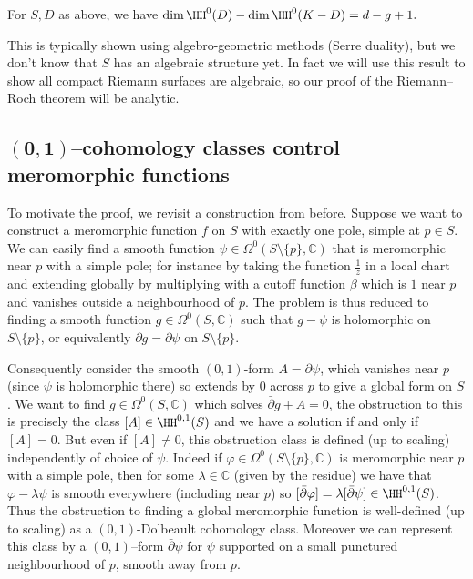 \begin{theorem}
    For \(S,D\) as above, we have
    \(\dim\HH^0(D)-\dim\HH^0(K-D)=d-g+1.\)
\end{theorem}

This is typically shown using algebro-geometric methods (Serre duality), but we
don't know that \(S\) has an algebraic structure yet. In fact we will use this
result to show all compact Riemann surfaces are algebraic, so our proof of the
Riemann--Roch theorem will be analytic.

\subsection{\(\mathbf{(0,1)}\)--cohomology classes control meromorphic
functions} To motivate the proof, we revisit a construction from before.
Suppose we want to construct a meromorphic function \(f\) on \(S\) with exactly
one pole, simple at \(p\in S\). We can easily find a smooth function
\(\psi\in \Omega^0(S\setminus \{p\}, \mathbb{C})\) that is meromorphic near
\(p\) with a simple pole; for instance by taking the function \(\frac{1}{z}\) in
a local chart and extending globally by multiplying with a cutoff function \(\beta\) which is \(1\) near \(p\) and vanishes outside a neighbourhood of \(p\). The problem is thus reduced to finding a smooth function \(g\in
\Omega^0(S,\mathbb{C})\) such that \(g-\psi\) is holomorphic
on \(S\setminus \{p\}\), or equivalently \(\bar\partial g= \bar\partial \psi\)
on \(S\setminus \{p\}\).

Consequently consider the smooth \((0,1)\)-form \(A=\bar\partial \psi\), which
vanishes near \(p\) (since \(\psi\) is holomorphic there) so extends by \(0\)
across \(p\) to give a global form on \(S\). We want to find \(g\in
\Omega^0(S,\mathbb{C})\) which solves \(\bar\partial g + A=0\), the obstruction
to this is precisely the class \([A]\in \HH^{0,1}(S)\) and we have a solution if
and only if \([A]=0\). But even if \([A]\neq 0\), this obstruction class is
defined (up to scaling) independently of choice of \(\psi\). Indeed if
\(\varphi\in \Omega^0(S\setminus\{p\},\mathbb{C})\) is meromorphic near \(p\)
with a simple pole, then for some \(\lambda \in \mathbb{C}\) (given by the
residue) we have that \(\varphi-\lambda \psi\) is smooth everywhere (including
near \(p\)) so \([\bar\partial \varphi]= \lambda[\bar\partial \psi]\in
\HH^{0,1}(S)\). Thus the obstruction to finding a global meromorphic function is
well-defined (up to scaling) as a \((0,1)\)-Dolbeault cohomology class. Moreover
we can represent this class by a \((0,1)\)--form \(\bar\partial \psi\) for
\(\psi\) supported on a small punctured neighbourhood of \(p\), smooth away from
\(p\).


